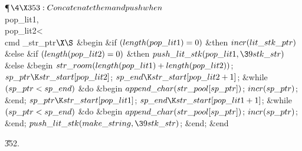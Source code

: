 \Y\P$\4\X353:Concatenate them and push when $\\{pop\_lit1},\\{pop\_lit2}<\\{cmd%
\_str\_ptr}$\X\S$\6
\&{begin} \&{if} $(\\{length}(\\{pop\_lit1})=0)$ \1\&{then}\5
$\\{incr}(\\{lit\_stk\_ptr})$\6
\4\&{else} \&{if} $(\\{length}(\\{pop\_lit2})=0)$ \1\&{then}\5
$\\{push\_lit\_stk}(\\{pop\_lit1},\39\\{stk\_str})$\6
\4\&{else} \2%
\2\6
\&{begin} $\\{str\_room}(\\{length}(\\{pop\_lit1})+\\{length}(\\{pop%
\_lit2}))$;\5
$\\{sp\_ptr}\K\\{str\_start}[\\{pop\_lit2}]$;\5
$\\{sp\_end}\K\\{str\_start}[\\{pop\_lit2}+1]$;\6
\&{while} $(\\{sp\_ptr}<\\{sp\_end})$ \1\&{do}\6
\&{begin} $\\{append\_char}(\\{str\_pool}[\\{sp\_ptr}])$;\5
$\\{incr}(\\{sp\_ptr})$;\6
\&{end};\2\6
$\\{sp\_ptr}\K\\{str\_start}[\\{pop\_lit1}]$;\5
$\\{sp\_end}\K\\{str\_start}[\\{pop\_lit1}+1]$;\6
\&{while} $(\\{sp\_ptr}<\\{sp\_end})$ \1\&{do}\6
\&{begin} $\\{append\_char}(\\{str\_pool}[\\{sp\_ptr}])$;\5
$\\{incr}(\\{sp\_ptr})$;\6
\&{end};\2\6
$\\{push\_lit\_stk}(\\{make\_string},\39\\{stk\_str})$;\6
\&{end};\6
\&{end}\par
\U352.\fi

